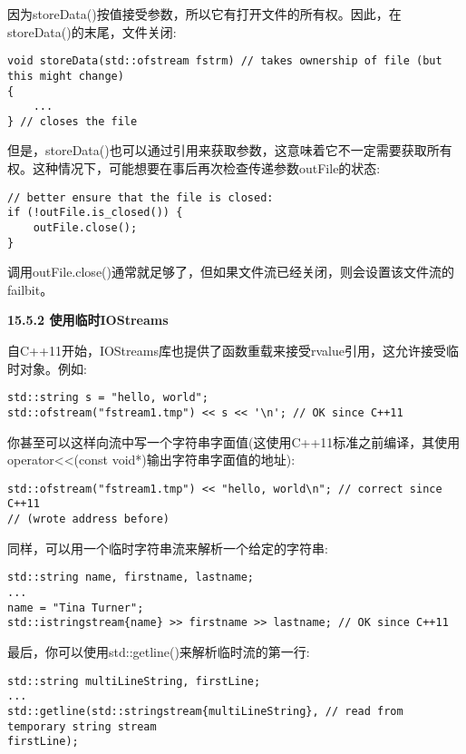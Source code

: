 因为storeData()按值接受参数，所以它有打开文件的所有权。因此，在storeData()的末尾，文件关闭:\par

\begin{lstlisting}[caption={}]
void storeData(std::ofstream fstrm) // takes ownership of file (but this might change)
{
	...
} // closes the file
\end{lstlisting}

但是，storeData()也可以通过引用来获取参数，这意味着它不一定需要获取所有权。这种情况下，可能想要在事后再次检查传递参数outFile的状态:\par

\begin{lstlisting}[caption={}]
// better ensure that the file is closed:
if (!outFile.is_closed()) {
	outFile.close();
}
\end{lstlisting}

调用outFile.close()通常就足够了，但如果文件流已经关闭，则会设置该文件流的failbit。\par

\hspace*{\fill} \par %
\textbf{15.5.2 使用临时IOStreams}

自C++11开始，IOStreams库也提供了函数重载来接受rvalue引用，这允许接受临时对象。例如:\par

\begin{lstlisting}[caption={}]
std::string s = "hello, world";
std::ofstream("fstream1.tmp") << s << '\n'; // OK since C++11
\end{lstlisting}

你甚至可以这样向流中写一个字符串字面值(这使用C++11标准之前编译，其使用operator<<(const void*)输出字符串字面值的地址):\par

\begin{lstlisting}[caption={}]
std::ofstream("fstream1.tmp") << "hello, world\n"; // correct since C++11
// (wrote address before)
\end{lstlisting}

同样，可以用一个临时字符串流来解析一个给定的字符串:\par

\begin{lstlisting}[caption={}]
std::string name, firstname, lastname;
...
name = "Tina Turner";
std::istringstream{name} >> firstname >> lastname; // OK since C++11
\end{lstlisting}

最后，你可以使用std::getline()来解析临时流的第一行:\par

\begin{lstlisting}[caption={}]
std::string multiLineString, firstLine;
...
std::getline(std::stringstream{multiLineString}, // read from temporary string stream
firstLine);
\end{lstlisting}



























